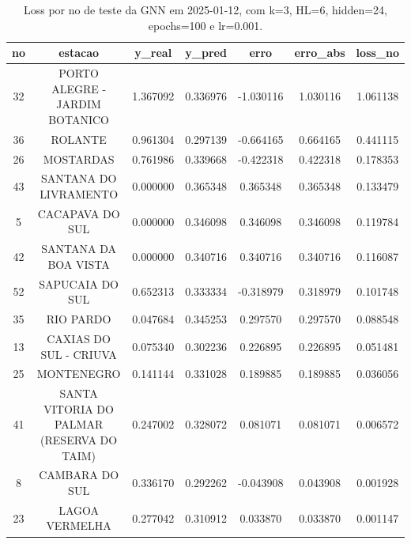 \begin{table}[h]
\centering
\caption{Loss por no de teste da GNN em 2025-01-12, com k=3, HL=6, hidden=24, epochs=100 e lr=0.001.}
\label{tab:gnn_loss_k3_hl6_h24_e100_d20250112}
\begin{tabular}{ccccccc}
\toprule
no & estacao & y\_real & y\_pred & erro & erro\_abs & loss\_no \\
\midrule
32 & PORTO ALEGRE - JARDIM BOTANICO & 1.367092 & 0.336976 & -1.030116 & 1.030116 & 1.061138 \\
36 & ROLANTE & 0.961304 & 0.297139 & -0.664165 & 0.664165 & 0.441115 \\
26 & MOSTARDAS & 0.761986 & 0.339668 & -0.422318 & 0.422318 & 0.178353 \\
43 & SANTANA DO LIVRAMENTO & 0.000000 & 0.365348 & 0.365348 & 0.365348 & 0.133479 \\
5 & CACAPAVA DO SUL & 0.000000 & 0.346098 & 0.346098 & 0.346098 & 0.119784 \\
42 & SANTANA DA BOA VISTA & 0.000000 & 0.340716 & 0.340716 & 0.340716 & 0.116087 \\
52 & SAPUCAIA DO SUL & 0.652313 & 0.333334 & -0.318979 & 0.318979 & 0.101748 \\
35 & RIO PARDO & 0.047684 & 0.345253 & 0.297570 & 0.297570 & 0.088548 \\
13 & CAXIAS DO SUL - CRIUVA & 0.075340 & 0.302236 & 0.226895 & 0.226895 & 0.051481 \\
25 & MONTENEGRO & 0.141144 & 0.331028 & 0.189885 & 0.189885 & 0.036056 \\
41 & SANTA VITORIA DO PALMAR (RESERVA DO TAIM) & 0.247002 & 0.328072 & 0.081071 & 0.081071 & 0.006572 \\
8 & CAMBARA DO SUL & 0.336170 & 0.292262 & -0.043908 & 0.043908 & 0.001928 \\
23 & LAGOA VERMELHA & 0.277042 & 0.310912 & 0.033870 & 0.033870 & 0.001147 \\
\bottomrule
\end{tabular}
\end{table}
